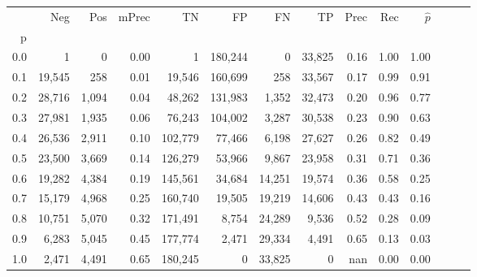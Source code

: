 \begin{tabular}{rrrrrrrrrrrrrr}
\toprule
{} &     Neg &    Pos & mPrec &       TN &       FP &      FN &      TP &  Prec &   Rec & $\hat{p}$ \\
p   &         &        &       &          &          &         &         &       &       &           \\
\midrule
0.0 &       1 &      0 &  0.00 &        1 &  180,244 &       0 &  33,825 &  0.16 &  1.00 &      1.00 \\
0.1 &  19,545 &    258 &  0.01 &   19,546 &  160,699 &     258 &  33,567 &  0.17 &  0.99 &      0.91 \\
0.2 &  28,716 &  1,094 &  0.04 &   48,262 &  131,983 &   1,352 &  32,473 &  0.20 &  0.96 &      0.77 \\
0.3 &  27,981 &  1,935 &  0.06 &   76,243 &  104,002 &   3,287 &  30,538 &  0.23 &  0.90 &      0.63 \\
0.4 &  26,536 &  2,911 &  0.10 &  102,779 &   77,466 &   6,198 &  27,627 &  0.26 &  0.82 &      0.49 \\
0.5 &  23,500 &  3,669 &  0.14 &  126,279 &   53,966 &   9,867 &  23,958 &  0.31 &  0.71 &      0.36 \\
0.6 &  19,282 &  4,384 &  0.19 &  145,561 &   34,684 &  14,251 &  19,574 &  0.36 &  0.58 &      0.25 \\
0.7 &  15,179 &  4,968 &  0.25 &  160,740 &   19,505 &  19,219 &  14,606 &  0.43 &  0.43 &      0.16 \\
0.8 &  10,751 &  5,070 &  0.32 &  171,491 &    8,754 &  24,289 &   9,536 &  0.52 &  0.28 &      0.09 \\
0.9 &   6,283 &  5,045 &  0.45 &  177,774 &    2,471 &  29,334 &   4,491 &  0.65 &  0.13 &      0.03 \\
1.0 &   2,471 &  4,491 &  0.65 &  180,245 &        0 &  33,825 &       0 &   nan &  0.00 &      0.00 \\
\bottomrule
\end{tabular}
